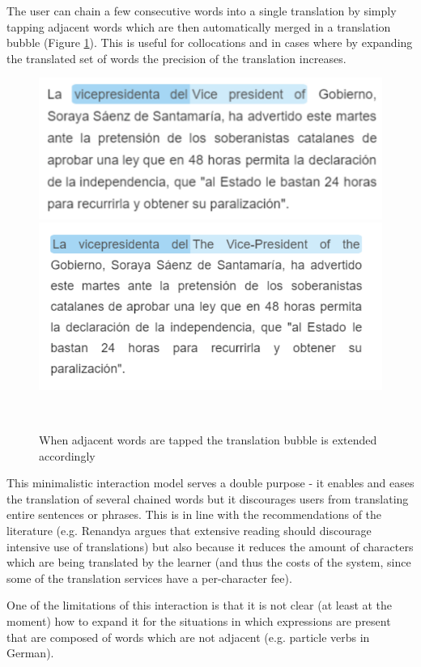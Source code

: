 The user can chain a few consecutive words into a single translation by simply tapping adjacent words which are then automatically merged in a translation bubble (Figure \ref{fig:translation_extension}). This is useful for collocations and in cases where by expanding the translated set of words the precision of the translation increases. 

    \begin{figure}[h!]
    \centering
      \includegraphics[width=0.7\columnwidth]{figures/translated_words1}
      \includegraphics[width=0.7\columnwidth]{figures/translated_words2}
      \caption{When adjacent words are tapped the translation bubble is extended accordingly}~\label{fig:translation_extension}
    \end{figure}

This minimalistic interaction model serves a double purpose - it enables and eases the translation of several chained words but it discourages users from translating entire sentences or phrases. This is in line with the recommendations of the literature (e.g. Renandya argues that extensive reading should discourage intensive use of translations\cite{renadya07-power}) but also because it reduces the amount of characters which are being translated by the learner (and thus the costs of the system, since some of the translation services have a per-character fee). 

One of the limitations of this interaction is that it is not clear (at least at the moment) how to expand it for the situations in which expressions are present that are composed of words which are not adjacent (e.g. particle verbs in German).


